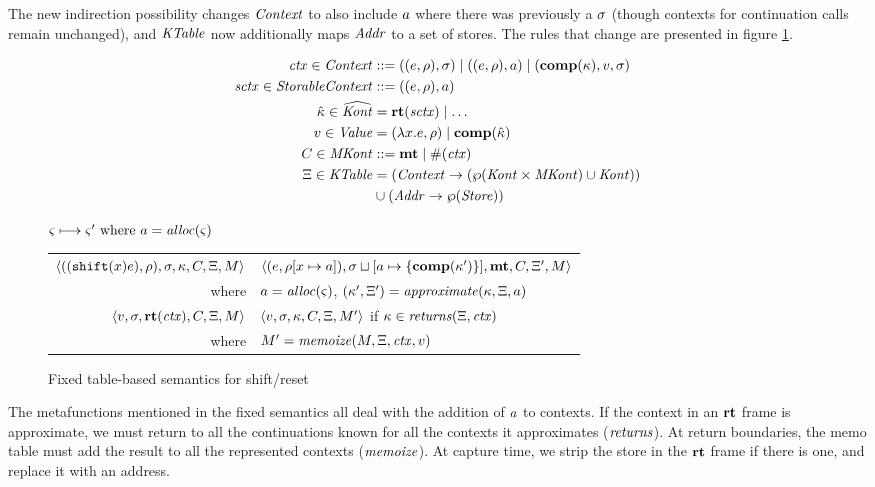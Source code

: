 \documentclass{llncs}
\begin{document}
The new indirection possibility changes $\mathit{Context}$ to also include
$a$ where there was previously a $\sigma$ (though contexts for
continuation calls remain unchanged), and $\mathit{KTable}$ now additionally
maps $\mathit{Addr}$ to a set of stores. The rules that change are presented in figure \ref{fig:shift-reset-table1}.

\begin{align*}
  \mathit{ctx} \in \mathit{Context} &::= ((e,\rho),\sigma) \mid ((e,\rho),a) \mid (\mathbf{comp}(\kappa),v,\sigma) \\
  \mathit{sctx} \in \mathit{StorableContext} &::= ((e,\rho),a) \\
  \hat{\kappa} \in \widehat{\mathit{Kont}} &= \mathbf{rt}(\mathit{sctx}) \mid \ldots \\
  v \in \mathit{Value} &= (\lambda{} x. e, \rho) \mid \mathbf{comp}(\hat{\kappa}) \\
  C \in \mathit{MKont} &::= \mathbf{mt} \mid \#(\mathit{ctx}) \\
  \Xi \in \mathit{KTable} &= (\mathit{Context} \to (\wp(\mathit{Kont} \times \mathit{MKont}) \cup \mathit{Kont})) \\
                   &\cup (\mathit{Addr} \to \wp(\mathit{Store}))
\end{align*}

\begin{figure}
  \centering
  $\varsigma \longmapsto \varsigma' \text{ where } a = \mathit{alloc}(\varsigma)$ \\
  \begin{tabular}{r|l}
    \hline
    $\langle ((\texttt{shift} (x) e), \rho), \sigma, \kappa, C, \Xi, M \rangle$
    &
    $\langle (e, \rho[x \mapsto a]), \sigma\sqcup[a \mapsto \{ \mathbf{comp}(\kappa') \}],\mathbf{mt},C,\Xi',M \rangle$
    \\
    where & $a = \mathit{alloc}(\varsigma)$, $(\kappa',\Xi') = \mathit{approximate}(\kappa, \Xi, a)$
\\
   $\langle v, \sigma, \mathbf{rt}(\mathit{ctx}), C, \Xi, M \rangle$
   &
   $\langle v, \sigma, \kappa, C, \Xi, M' \rangle$
   if $\kappa \in \mathit{returns}(\Xi, \mathit{ctx})$
   \\
   where & $M' = \mathit{memoize}(M, \Xi, \mathit{ctx}, v)$
  \end{tabular}
  \caption{Fixed table-based semantics for shift/reset}
  \label{fig:shift-reset-table1}
\end{figure}

The metafunctions mentioned in the fixed semantics all deal with the
addition of $a$ to contexts. If the context in an $\mathbf{rt}$ frame is
approximate, we must return to all the continuations known for all the
contexts it approximates ($\mathit{returns}$). At return boundaries, the memo
table must add the result to all the represented contexts
($\mathit{memoize}$). At capture time, we strip the store in the $\mathbf{rt}$ frame
if there is one, and replace it with an address.
\end{document}
